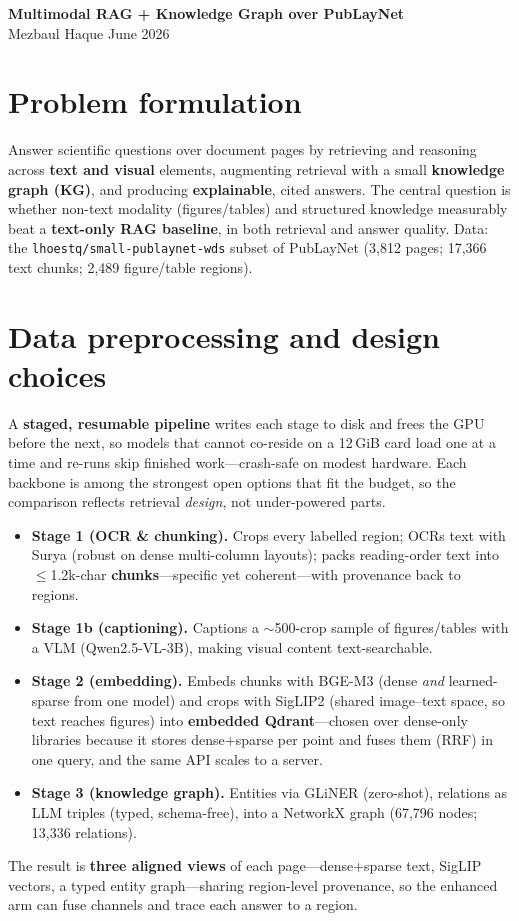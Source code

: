 \documentclass[10pt,oneside,a4paper]{article}
\begin{document}
\begin{center}
  {\large\bfseries Multimodal RAG + Knowledge Graph over PubLayNet}\\[3pt]
  {\small Mezbaul Haque \quad\textbullet\quad June 2026}
\end{center}
\vspace{2pt}

\section{Problem formulation}

Answer scientific questions over document pages by retrieving and reasoning across
\textbf{text and visual} elements, augmenting retrieval with a small \textbf{knowledge
graph (KG)}, and producing \textbf{explainable}, cited answers. The central question
is whether non-text modality (figures/tables) and structured knowledge measurably
beat a \textbf{text-only RAG baseline}, in both retrieval and answer quality. Data:
the \texttt{lhoestq/small-publaynet-wds} subset of PubLayNet (3,812 pages; 17,366
text chunks; 2,489 figure/table regions).

\section{Data preprocessing and design choices}
A \textbf{staged, resumable pipeline} writes each stage to disk and frees the GPU
before the next, so models that cannot co-reside on a 12\,GiB card load one at a time
and re-runs skip finished work---crash-safe on modest hardware. Each backbone is
among the strongest open options that fit the budget, so the comparison reflects
retrieval \emph{design}, not under-powered parts.
\begin{itemize}
  \item \textbf{Stage 1 (OCR \& chunking).} Crops every labelled region; OCRs text
  with Surya (robust on dense multi-column layouts); packs reading-order text into
  $\le$1.2k-char \textbf{chunks}---specific yet coherent---with provenance back to
  regions.
  \item \textbf{Stage 1b (captioning).} Captions a $\sim$500-crop sample of
  figures/tables with a VLM (Qwen2.5-VL-3B), making visual content text-searchable.
  \item \textbf{Stage 2 (embedding).} Embeds chunks with BGE-M3 (dense \emph{and}
  learned-sparse from one model) and crops with SigLIP2 (shared image--text space, so
  text reaches figures) into \textbf{embedded Qdrant}---chosen over dense-only
  libraries because it stores dense+sparse per point and fuses them (RRF) in one
  query, and the same API scales to a server.
  \item \textbf{Stage 3 (knowledge graph).} Entities via GLiNER (zero-shot), relations
  as LLM triples (typed, schema-free), into a NetworkX graph (67{,}796 nodes;
  13{,}336 relations).
\end{itemize}
The result is \textbf{three aligned views} of each page---dense+sparse text, SigLIP
vectors, a typed entity graph---sharing region-level provenance, so the enhanced arm
can fuse channels and trace each answer to a region.
\end{document}
